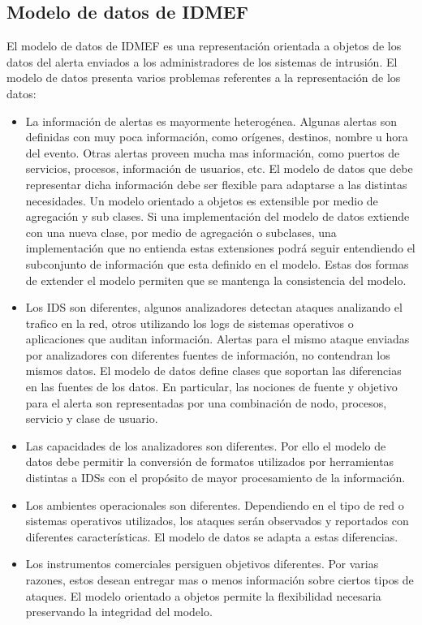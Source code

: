 \subsection{Modelo de datos de IDMEF}
El modelo de datos de IDMEF es una representación orientada a objetos de los 
datos del alerta enviados a los administradores de los sistemas de intrusión.
El modelo de datos presenta varios problemas referentes a la representación de 
los datos:
\begin{itemize}
  \item La información de alertas es mayormente heterogénea. Algunas alertas son 
  definidas con muy poca información, como orígenes, destinos, nombre u hora del 
  evento. Otras alertas proveen mucha mas información, como puertos de 
  servicios, procesos, información de usuarios, etc. El modelo de datos que debe 
  representar dicha información debe ser flexible para adaptarse a las distintas 
  necesidades. Un modelo orientado a objetos es extensible por medio de 
  agregación y sub clases. Si una implementación del modelo de datos extiende 
  con una nueva clase, por medio de agregación o subclases, una implementación 
  que no entienda estas extensiones podrá seguir entendiendo el subconjunto de 
  información que esta definido en el modelo. Estas dos formas de extender el 
  modelo permiten que se mantenga la consistencia del modelo.
  \item Los IDS son diferentes, algunos analizadores detectan ataques analizando 
  el trafico en la red, otros utilizando los logs de sistemas operativos o 
  aplicaciones que auditan información. Alertas para el mismo ataque enviadas 
  por analizadores con diferentes fuentes de información, no contendran los 
  mismos datos.
  El modelo de datos define clases que soportan las diferencias en las fuentes 
  de los datos. En particular, las nociones de fuente y objetivo para el alerta 
  son representadas por una combinación de nodo, procesos, servicio y clase de 
  usuario.
  \item Las capacidades de los analizadores son diferentes. Por ello el modelo 
  de datos debe permitir la conversión de formatos utilizados por herramientas 
  distintas a IDSs con el propósito de mayor procesamiento de la información.
  \item Los ambientes operacionales son diferentes. Dependiendo en el tipo de 
  red o sistemas operativos utilizados, los ataques serán observados y 
  reportados con diferentes características. El modelo de datos se 
  adapta a estas diferencias.
  \item Los instrumentos comerciales persiguen objetivos diferentes. Por varias 
  razones, estos desean entregar mas o menos información sobre ciertos tipos de 
  ataques. El modelo orientado a objetos permite la flexibilidad necesaria 
  preservando la integridad del modelo.
\end{itemize}

